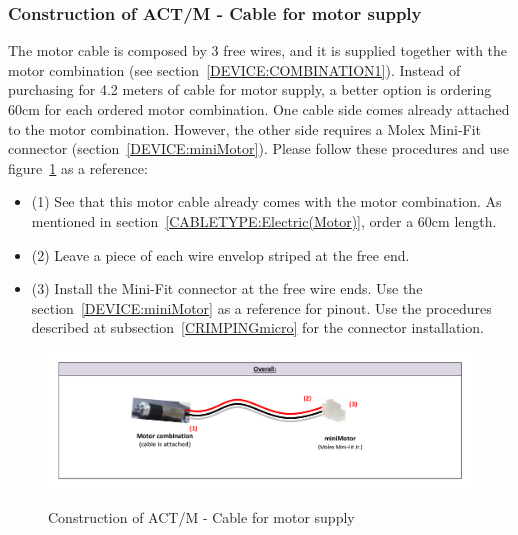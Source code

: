 \subsubsection{Construction of ACT/M - Cable for motor supply} \label{CONSTRUCTION:ACTM}
The motor cable is composed by 3 free wires, and it is supplied together with the motor combination (see section~\ref{DEVICE:COMBINATION1}). Instead of purchasing for 4.2 meters of cable for motor supply, a better option is ordering 60cm for each ordered motor combination. One cable side comes already attached to the motor combination. However, the other side requires a Molex Mini-Fit connector (section~\ref{DEVICE:miniMotor}). Please follow these procedures and use figure~\ref{FIG:ACTMconstruction} as a reference:
\begin{itemize}
  \item (1) See that this motor cable already comes with the motor combination. As mentioned in section~\ref{CABLETYPE:Electric(Motor)}, order a 60cm length.
  \item (2) Leave a piece of each wire envelop striped at the free end.
  \item (3) Install the Mini-Fit connector at the free wire ends. Use the section~\ref{DEVICE:miniMotor} as a reference for pinout. Use the procedures described at subsection~\ref{CRIMPINGmicro} for the connector installation.
\end{itemize}
\begin{figure}
  \centering
  \includegraphics[angle=90,width=1\columnwidth]{figs/body03/FIGACTMconstruction.pdf}\\
  \caption[Construction of ACT/M - Cable for motor supply]{Construction of ACT/M - Cable for motor supply}
  \label{FIG:ACTMconstruction}
\end{figure}

